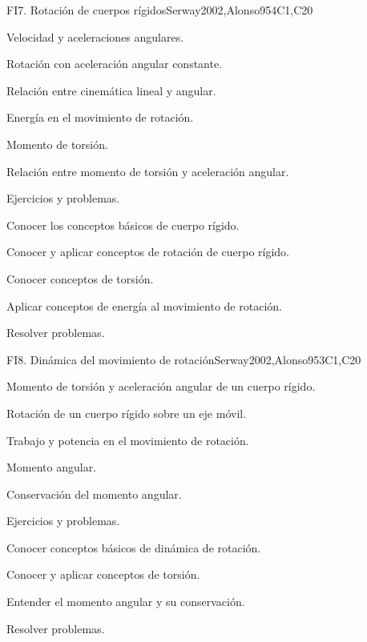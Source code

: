 \begin{syllabus}
\begin{unit}{FI7. Rotación de cuerpos rígidos}{}{Serway2002,Alonso95}{4}{C1,C20}
\begin{topics}
      \item Velocidad y aceleraciones angulares.
      \item Rotación con aceleración angular constante.
      \item Relación entre cinemática lineal y angular.
      \item Energía en el movimiento de rotación.
      \item Momento de torsión.
      \item Relación entre momento de torsión y aceleración angular.
      \item Ejercicios y problemas.
   \end{topics}

   \begin{learningoutcomes}
      \item Conocer los conceptos básicos de cuerpo rígido.
      \item Conocer y aplicar conceptos de rotación de cuerpo rígido.
      \item Conocer conceptos de torsión.
      \item Aplicar conceptos de energía al movimiento de rotación.
      \item Resolver problemas.
   \end{learningoutcomes}
\end{unit}

\begin{unit}{FI8. Dinámica del movimiento de rotación}{}{Serway2002,Alonso95}{3}{C1,C20}
\begin{topics}
      \item Momento de torsión y aceleración angular de un cuerpo rígido.
      \item Rotación de un cuerpo rígido sobre un eje móvil.
      \item Trabajo y potencia en el movimiento de rotación.
      \item Momento angular.
      \item Conservación del momento angular.
      \item Ejercicios y problemas.
    \end{topics}

   \begin{learningoutcomes}
      \item Conocer conceptos básicos de dinámica de rotación.
      \item Conocer y aplicar conceptos de torsión.
      \item Entender el momento angular y su conservación.
      \item Resolver problemas.
   \end{learningoutcomes}
\end{unit}



\begin{coursebibliography}
\end{coursebibliography}
\end{syllabus}
